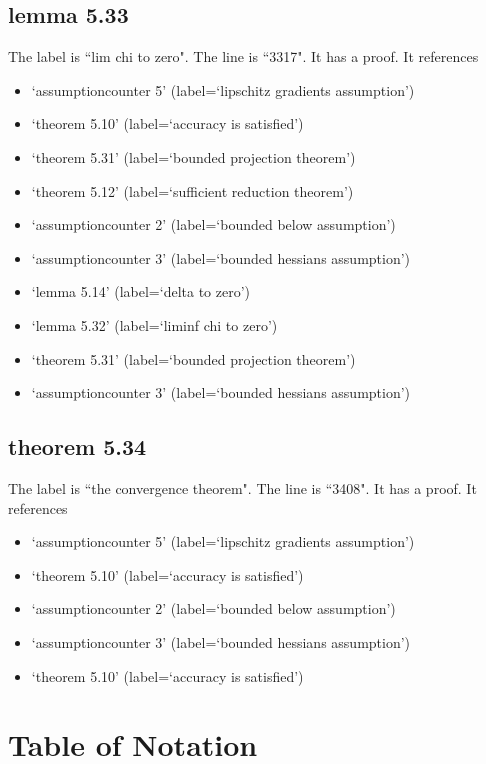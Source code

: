 \documentclass{article}
\begin{document}
\subsection{lemma 5.33}
The label is ``lim chi to zero".
The line is ``3317".
It has a proof.
It references \begin{itemize}
\item `assumptioncounter 5' (label=`lipschitz gradients assumption')
\item `theorem 5.10' (label=`accuracy is satisfied')
\item `theorem 5.31' (label=`bounded projection theorem')
\item `theorem 5.12' (label=`sufficient reduction theorem')
\item `assumptioncounter 2' (label=`bounded below assumption')
\item `assumptioncounter 3' (label=`bounded hessians assumption')
\item `lemma 5.14' (label=`delta to zero')
\item `lemma 5.32' (label=`liminf chi to zero')
\item `theorem 5.31' (label=`bounded projection theorem')
\item `assumptioncounter 3' (label=`bounded hessians assumption')
\end{itemize}
\subsection{theorem 5.34}
The label is ``the convergence theorem".
The line is ``3408".
It has a proof.
It references \begin{itemize}
\item `assumptioncounter 5' (label=`lipschitz gradients assumption')
\item `theorem 5.10' (label=`accuracy is satisfied')
\item `assumptioncounter 2' (label=`bounded below assumption')
\item `assumptioncounter 3' (label=`bounded hessians assumption')
\item `theorem 5.10' (label=`accuracy is satisfied')
\end{itemize}
\section{Table of Notation}
\end{document}
